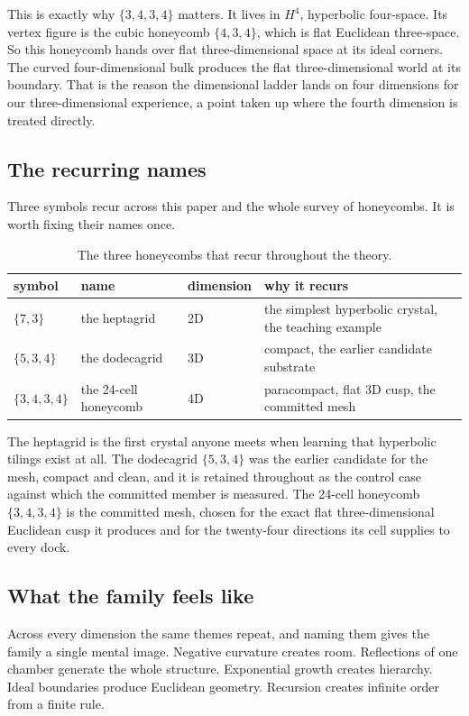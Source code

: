 This is exactly why $\{3,4,3,4\}$ matters. It lives in $H^4$, hyperbolic four-space. Its vertex figure is the cubic honeycomb $\{4,3,4\}$, which is flat Euclidean three-space. So this honeycomb hands over flat three-dimensional space at its ideal corners. The curved four-dimensional bulk produces the flat three-dimensional world at its boundary. That is the reason the dimensional ladder lands on four dimensions for our three-dimensional experience, a point taken up where the fourth dimension is treated directly.

\subsection{The recurring names}

Three symbols recur across this paper and the whole survey of honeycombs. It is worth fixing their names once.

\begin{table}[ht]
\centering
\begin{tabular}{@{}llll@{}}
\toprule
symbol & name & dimension & why it recurs \\
\midrule
$\{7,3\}$ & the heptagrid & 2D & the simplest hyperbolic crystal, the teaching example \\
$\{5,3,4\}$ & the dodecagrid & 3D & compact, the earlier candidate substrate \\
$\{3,4,3,4\}$ & the 24-cell honeycomb & 4D & paracompact, flat 3D cusp, the committed mesh \\
\bottomrule
\end{tabular}
\caption{The three honeycombs that recur throughout the theory.}
\label{tab:recurring-names}
\end{table}

The heptagrid is the first crystal anyone meets when learning that hyperbolic tilings exist at all. The dodecagrid $\{5,3,4\}$ was the earlier candidate for the mesh, compact and clean, and it is retained throughout as the control case against which the committed member is measured. The 24-cell honeycomb $\{3,4,3,4\}$ is the committed mesh, chosen for the exact flat three-dimensional Euclidean cusp it produces and for the twenty-four directions its cell supplies to every dock.

\subsection{What the family feels like}

Across every dimension the same themes repeat, and naming them gives the family a single mental image. Negative curvature creates room. Reflections of one chamber generate the whole structure. Exponential growth creates hierarchy. Ideal boundaries produce Euclidean geometry. Recursion creates infinite order from a finite rule.

